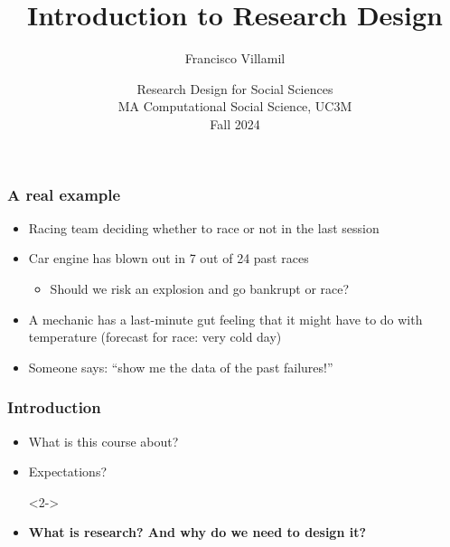 \documentclass[aspectratio=43]{beamer}
\title[Lecture 1: Introduction to Research Design]{\Large Introduction to Research Design}
\author[]{Francisco Villamil}
\date[]{Research Design for Social Sciences\\MA Computational Social Science, UC3M\\Fall 2024}
\begin{document}

\begin{frame}

  \titlepage

\end{frame}

\begin{frame}
\frametitle{A real example}
\centering

\begin{itemize}[<+->]
  \item Racing team deciding whether to race or not in the last session
  \item Car engine has blown out in 7 out of 24 past races
  \begin{itemize}
    \item Should we risk an explosion and go bankrupt or race?
  \end{itemize}
  \item A mechanic has a last-minute gut feeling that it might have to do with temperature (forecast for race: very cold day)
  \item Someone says: ``show me the data of the past failures!''
\end{itemize}

\end{frame}




\begin{frame}
\frametitle{Introduction}
\centering

\begin{itemize}
  \item<1-> What is this course about?
  \item<1-> Expectations?
  \item[]<2->
  \item<2-> \textbf{What is research? And why do we need to design it?}
\end{itemize}

\end{frame}
\end{document}
